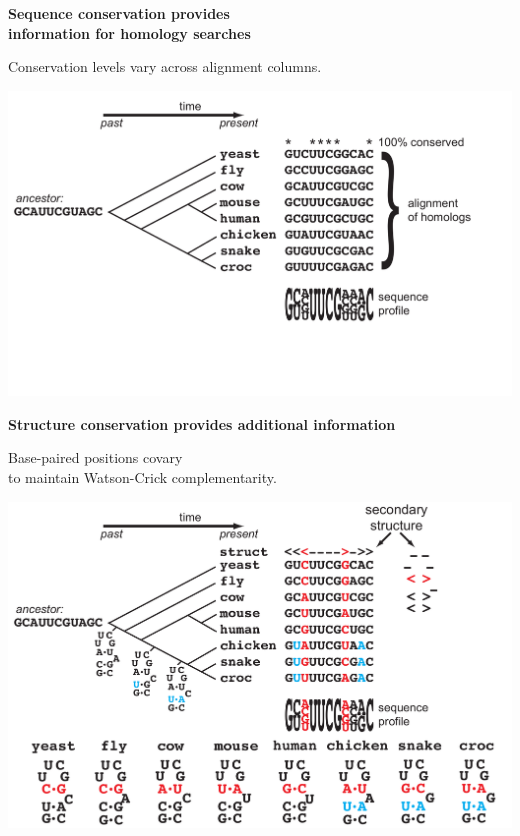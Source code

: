 \documentclass[landscape]{slides}
\begin{document}
\begin{slide}
\begin{center}
\textbf{Sequence conservation provides \\ information for homology searches}

\medskip
Conservation levels vary across alignment columns.

\includegraphics[width=10in]{figs/seqstructprofiles-seq1}
\end{center}

\vfill
\end{slide}
\begin{slide}
\begin{center}
\textbf{Structure conservation provides additional information}
\medskip

Base-paired positions covary \\ to maintain Watson-Crick complementarity.

\includegraphics[width=10in]{figs/seqstructprofiles-struct2}
\end{center}

\vfill
\end{slide}
\end{document}
